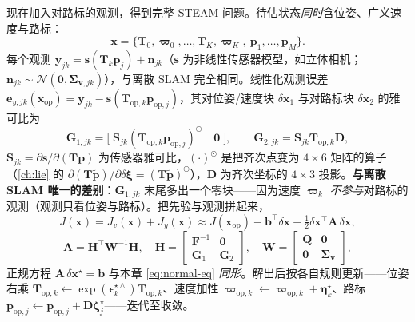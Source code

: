 现在加入对路标的观测，得到完整 STEAM 问题。待估状态\emph{同时}含位姿、广义速度与路标：
\begin{equation}
  \mathbf{x}=\{\mathbf{T}_0,\boldsymbol{\varpi}_0,\dots,\mathbf{T}_K,\boldsymbol{\varpi}_K,\ \mathbf{p}_1,\dots,\mathbf{p}_M\}.
  \label{eq:steam-state}
\end{equation}
每个观测 $\mathbf{y}_{jk}=\mathbf{s}(\mathbf{T}_k\mathbf{p}_j)+\mathbf{n}_{jk}$（$\mathbf{s}$ 为非线性传感器模型，如立体相机；$\mathbf{n}_{jk}\sim\mathcal{N}(\mathbf{0},\boldsymbol{\Sigma}_{\mathbf{v},jk})$），与离散 SLAM 完全相同。线性化观测误差 $\mathbf{e}_{y,jk}(\mathbf{x}_{\mathrm{op}})=\mathbf{y}_{jk}-\mathbf{s}(\mathbf{T}_{\mathrm{op},k}\mathbf{p}_{\mathrm{op},j})$，其对位姿/速度块 $\delta\mathbf{x}_1$ 与对路标块 $\delta\mathbf{x}_2$ 的雅可比为
\begin{equation}
  \mathbf{G}_{1,jk}=\big[\;\mathbf{S}_{jk}(\mathbf{T}_{\mathrm{op},k}\mathbf{p}_{\mathrm{op},j})^\odot\quad \mathbf{0}\;\big],\qquad
  \mathbf{G}_{2,jk}=\mathbf{S}_{jk}\mathbf{T}_{\mathrm{op},k}\mathbf{D},
  \label{eq:steam-G}
\end{equation}
$\mathbf{S}_{jk}=\partial\mathbf{s}/\partial(\mathbf{T}\mathbf{p})$ 为传感器雅可比，$(\cdot)^\odot$ 是把齐次点变为 $4\times6$ 矩阵的算子（\cref{ch:lie} 的 $\partial(\mathbf{T}\tilde{\mathbf{p}})/\partial\delta\boldsymbol{\xi}=(\mathbf{T}\tilde{\mathbf{p}})^\odot$），$\mathbf{D}$ 为齐次坐标的 $4\times3$ 投影。\textbf{与离散 SLAM 唯一的差别}：$\mathbf{G}_{1,jk}$ 末尾多出一个零块——因为速度 $\boldsymbol{\varpi}_k$ \emph{不参与}对路标的观测（观测只看位姿与路标）。把先验与观测拼起来，
\begin{equation}
  J(\mathbf{x})=J_v(\mathbf{x})+J_y(\mathbf{x})\approx J(\mathbf{x}_{\mathrm{op}})-\mathbf{b}^\top\delta\mathbf{x}+\tfrac12\delta\mathbf{x}^\top\mathbf{A}\,\delta\mathbf{x},
  \label{eq:steam-J}
\end{equation}
\begin{equation}
  \mathbf{A}=\mathbf{H}^\top\mathbf{W}^{-1}\mathbf{H},\quad
  \mathbf{H}=\begin{bmatrix}\mathbf{F}^{-1}&\mathbf{0}\\\mathbf{G}_1&\mathbf{G}_2\end{bmatrix},\quad
  \mathbf{W}=\begin{bmatrix}\mathbf{Q}&\mathbf{0}\\\mathbf{0}&\boldsymbol{\Sigma}_{\mathbf{v}}\end{bmatrix},
  \label{eq:steam-A}
\end{equation}
正规方程 $\mathbf{A}\,\delta\mathbf{x}^\star=\mathbf{b}$ 与本章 \cref{eq:normal-eq} \emph{同形}。解出后按各自规则更新——位姿右乘 $\mathbf{T}_{\mathrm{op},k}\leftarrow\exp(\boldsymbol{\epsilon}_k^{\star\wedge})\mathbf{T}_{\mathrm{op},k}$、速度加性 $\boldsymbol{\varpi}_{\mathrm{op},k}\leftarrow\boldsymbol{\varpi}_{\mathrm{op},k}+\boldsymbol{\eta}_k^\star$、路标 $\mathbf{p}_{\mathrm{op},j}\leftarrow\mathbf{p}_{\mathrm{op},j}+\mathbf{D}\boldsymbol{\zeta}_j^\star$——迭代至收敛。

